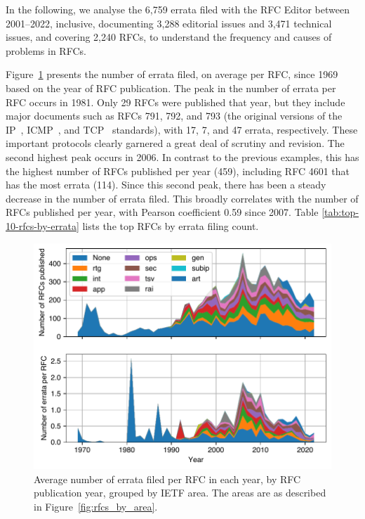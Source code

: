 \documentclass[twocolumn,10pt]{article}
\newlength{\figureWidthOneColumn}
\newcommand{\pb}[1]{\vspace{0.75ex}\noindent{\textbf{#1}}}
\begin{document}
In the following, we analyse the 6,759 errata filed with the RFC Editor
between 2001–2022, inclusive, documenting 3,288 editorial issues and 3,471
technical issues, and covering 2,240 RFCs, to understand the frequency
and causes of problems in RFCs.


\pb{Errata over Time:}
Figure~\ref{fig:errata_per_year} presents the number of errata filed, on
average per RFC, since 1969 based on the year of RFC publication.  The peak
in the number of errata per RFC occurs in 1981. Only 29 RFCs were published
that year, but they include major documents such as RFCs 791, 792, and 793
(the original versions of the IP~\cite{RFC791}, ICMP~\cite{RFC792}, and
TCP~\cite{RFC793} standards), with 17, 7, and 47 errata, respectively.
These important protocols clearly garnered a great deal of scrutiny and
revision.  The second highest peak occurs in 2006.  In contrast to the
previous examples, this has the highest number of RFCs published per year
(459), including RFC 4601 \cite{RFC4601} that has the most errata (114).
Since this second peak, there has been a steady decrease in the number of
errata filed.  This broadly correlates with the number of RFCs published
per year, with Pearson coefficient 0.59 since 2007.
Table \ref{tab:top-10-rfcs-by-errata} lists the top RFCs by errata filing
count.

\begin{figure}
  \centering
  \includegraphics[width=\figureWidthOneColumn]{figures-prev/tma-2023/errata-by-year.pdf}
  \caption{
    Average number of errata filed per RFC in each year, by RFC publication year,
    grouped by IETF area. The areas are as described in Figure~\ref{fig:rfcs_by_area}.
  }
  \label{fig:errata_per_year}
\end{figure}
\end{document}
